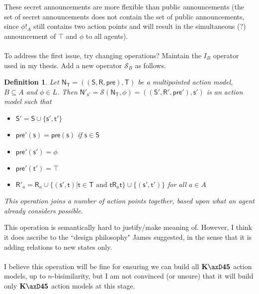 \documentclass[12pt, a4paper]{article}
\newtheorem{defn}{Definition}[chapter]
\numberwithin{equation}{chapter}
\newcommand{\axK}{\ensuremath{\bf K}}
\newcommand{\axFo}{\ensuremath{\bf 4}}
\newcommand{\axFi}{\ensuremath{\bf 5}}
\newcommand{\aMod}[1]{
  \ensuremath {\mathrm{\mathsf{#1}}}
}
\newcommand{\evMo}{\aMod{N}}
\newcommand{\evM}{\evMo}
\newcommand{\evS}{\aMod{S}}
\newcommand{\evR}{\aMod{R}}
\newcommand{\evpr}{\aMod{pre}}
\newcommand{\evT}{\aMod{T}}
\newcommand{\evs}{\aMod{s}}
\newcommand{\evt}{\aMod{t}}
\begin{document}
These secret announcements are more flexible than public announcements (the set of secret
announcements does not contain the set of public announcements, since $\phi!_A$ still contains two
action points and will result in the simultaneous (?) announcement of $\top$ and $\phi$ to all
agents).\\
\\
To address the first issue, try changing operations?
Maintain the $I_B$ operator used in my thesis.
Add a new operator $\mathcal{S}_B$ as follows.

\begin{defn}
  Let $\evM_\evT = ((\evS, \evR, \evpr), \evT)$ be a multipointed action model,
  $B \subseteq A$ and $\phi \in L$.
  Then $\evM'_{\evs'} = \mathcal{S}(\evM_\evT, \phi) = ((\evS', \evR', \evpr'),
      {\evs'})$ is an action model such that
  \begin{itemize}
    \item $\evS' = \evS \cup \{\evs', \evt'\}$
    \item $\evpr'(\evs) = \evpr(\evs)$ if $\evs \in \evS$
    \item $\evpr'(\evs') = \phi$
    \item $\evpr'(\evt') = \top$
    \item $\evR'_a = \evR_a \cup \{ (\evs', \evt) | \evt \in \evT \text{ and }
      \evt \evR_a \evt \} \cup \{(\evs', \evt')\}$ for all $a \in A$
  \end{itemize}
  This operation {\em joins} a number of action points together, based upon what
  an agent already considers possible.
\end{defn}

This operation is semantically hard to justify/make meaning of.
However, I think it does ascribe to the ``design philosophy" James suggested, in
the sense that it is adding relations to new states only.\\
\\
I believe this operation will be fine for ensuring we can build all
$\axK\axD\axFo\axFi$ action models, up to $n$-bisimilarity, but I am not
convinced (or unsure) that it will build only $\axK\axD\axFo\axFi$ action models
at this stage.
\end{document}
